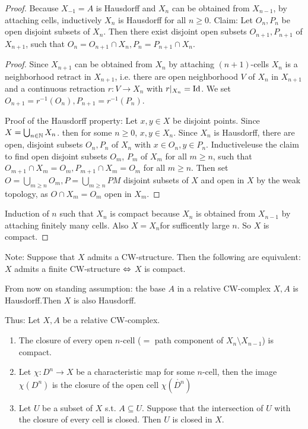 \documentclass{TemplateLecture}
\begin{document}
\begin{proof}
    Because \(X_{-1} = A\) is Hausdorff and \(X_n\) can be obtained from \(X_{n-1}\), by attaching cells, inductively \(X_n\) is Hausdorff for all \(n \geq 0\).
    Claim: Let \(O_n, P_n\) be open disjoint subsets of \(X_n\). Then there exist disjoint open subsets \(O_{n+1}, P_{n+1}\) of \(X_{n+1}\), such that \(O_n = O_{n+1} \cap X_n, P_n = P_{n+1} \cap X_n\).
    \begin{proof}
        Since \(X_{n+1}\) can be obtained from \(X_n\) by attaching \((n+1)\)-cells \(X_n\) is a neighborhood retract in \(X_{n+1}\), i.e. there are open neighborhood \(V\) of \(X_n\) in \(X_{n+1}\) and a continuous retraction \(r\colon V\to X_n\) with \(r \rvert_{X_n} = \mathrm{Id}\). We set \(O_{n+1} = r^{-1}(O_n), P_{n+1} = r^{-1}(P_n)\).

        Proof of the Hausdorff property: Let \(x,y \in X\) be disjoint points. Since \(X = \bigcup_{n \in \mathbb{N}} X_n\). then for some \(n \geq 0\), \(x,y \in X_n\). Since \(X_n\) is Hausdorff, there are open, disjoint subsets \(O_n, P_n\) of \(X_n\) with \(x \in O_n, y \in P_n\). Inductiveleuse the claim to find open disjoint subsets \(O_m\), \(P_m\) of \(X_m\) for all \(m \geq n\), such that \(O_{m+1} \cap X_m = O_m, P_{m+1} \cap X_m = O_m\) for all \(m \geq n\). Then set \(O = \bigcup_{m \geq n} O_m, P = \bigcup_{m\geq n} PM\) disjoint subsets of \(X\) and open in \(X\) by the weak topology, as \(O\cap X_m = O_m\) open in \(X_m\).
    \end{proof} 

    Induction of \(n\) such that \(X_n\) is compact because \(X_n\) is obtained from \(X_{n-1}\) by attaching finitely many cells. Also \(X = X_n\)for sufficently large \(n\). So \(X\) is compact.
\end{proof}

Note: Suppose that \(X\) admits a CW-structure. Then the following are equivalent: \(X\) admits a finite CW-structure \(\Leftrightarrow\) \(X\) is compact.

From now on standing assumption: the base \(A\) in a relative CW-complex \(X,A\) is Hausdorff.Then \(X\) is also Hausdorff.

Thus: Let \(X,A\) be a relative CW-complex.

\begin{enumerate}
    \item The closure of every open \(n\)-cell (\(=\) path component of \(X_n\setminus X_{n-1}\)) is compact.
    \item Let \(\chi\colon D^n \to X\) be a characteristic map for some \(n\)-cell, then  the image \(\chi(D^n)\) is the closure of the open cell \(\chi(\mathring{D^n})\)
    \item Let \(U\) be a subset of \(X\) s.t. \(A\subseteq U\). Suppose that the intersection of \(U\) with the closure of every cell is closed. Then \(U\) is closed in \(X\).
\end{enumerate}
\end{document}

